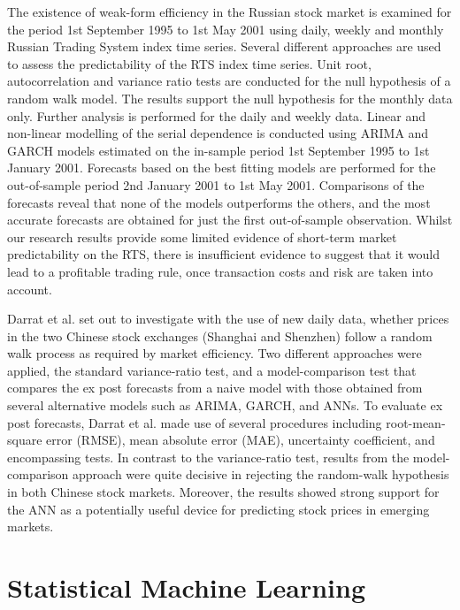 The existence of weak-form efficiency in the Russian stock market is examined for the period 1st September 1995 to 1st May 2001 using daily, weekly and monthly Russian Trading System index time series.\cite{Abrosimova:2002aa} Several different approaches are used to assess the predictability of the RTS index time series. Unit root, autocorrelation and variance ratio tests are conducted for the null hypothesis of a random walk model. The results support the null hypothesis for the monthly data only. Further analysis is performed for the daily and weekly data. Linear and non-linear modelling of the serial dependence is conducted using ARIMA and GARCH models estimated on the in-sample period 1st September 1995 to 1st January 2001. Forecasts based on the best fitting models are performed for the out-of-sample period 2nd January 2001 to 1st May 2001. Comparisons of the forecasts reveal that none of the models outperforms the others, and the most accurate forecasts are obtained for just the first out-of-sample observation. Whilst our research results provide some limited evidence of short-term market predictability on the RTS, there is insufficient evidence to suggest that it would lead to a profitable trading rule, once transaction costs and risk are taken into account.

Darrat et al. set out to investigate with the use of new daily data, whether prices in the two Chinese stock exchanges (Shanghai and Shenzhen) follow a random walk process as required by market efficiency.\cite{Darrat:2001aa} Two different approaches were applied, the standard variance-ratio test, and a model-comparison test that compares the ex post forecasts from a naive model with those obtained from several alternative models such as ARIMA, GARCH, and ANNs. To evaluate ex post forecasts, Darrat et al. made use of several procedures including root-mean-square error (RMSE), mean absolute error (MAE), uncertainty coefficient, and encompassing tests. In contrast to the variance-ratio test, results from the model-comparison approach were quite decisive in rejecting the random-walk hypothesis in both Chinese stock markets. Moreover, the results showed strong support for the ANN as a potentially useful device for predicting stock prices in emerging markets.

\section{Statistical Machine Learning}

